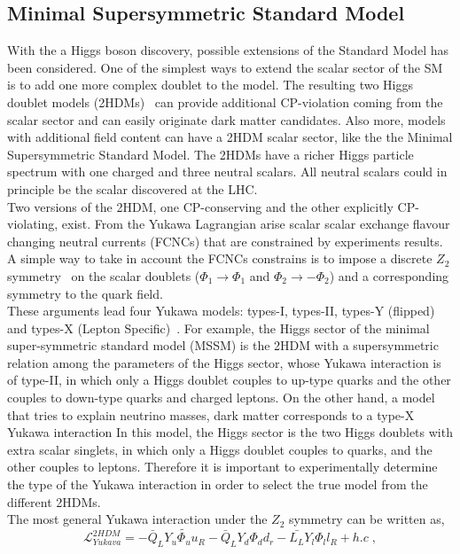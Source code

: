 \subsection*{Minimal Supersymmetric Standard Model} 
With the a Higgs boson discovery, possible extensions of the Standard Model has been considered. 
One of the simplest ways to extend the scalar sector of the SM is to add one more complex doublet to the model.
The resulting two Higgs doublet models (2HDMs)~\cite{Barroso:2013zxa} can provide additional CP-violation coming from the scalar 
sector and can easily originate dark matter candidates.  
Also more,  models with additional field content can have a 2HDM scalar sector, like the  the Minimal Supersymmetric Standard Model.  
The 2HDMs have a richer Higgs particle spectrum with one
charged and three neutral scalars.  All neutral scalars could in principle be the scalar discovered at the LHC.\\
Two versions of the 2HDM,  one CP-conserving and the other explicitly  CP-violating, exist.   
From the Yukawa Lagrangian arise scalar  scalar  exchange  flavour changing neutral currents (FCNCs) that are constrained by experiments results.
A simple way to take in account the FCNCs constrains is to impose a discrete $Z_2$ symmetry~\cite{PhysRevD.15.1958} on the scalar doublets ($\Phi_{1} \to \Phi_{1}$ and  $\Phi_{2} \to -\Phi_{2}$)  and a corresponding symmetry to the quark field.\\
These arguments  lead four Yukawa models: types-I, types-II, types-Y (flipped) and types-X (Lepton Specific)~\cite{PhysRevD.41.3421, PhysRevD.80.015017}. 
For example, the Higgs sector of the minimal super-symmetric standard model (MSSM) is the 2HDM with a supersymmetric relation  among
the parameters of the Higgs sector, whose Yukawa interaction is of type-II, in which only
a Higgs doublet couples to up-type quarks and the other couples to down-type quarks and charged leptons.
On the other hand, a  model that tries to explain neutrino masses, dark matter corresponds to a type-X  Yukawa interaction
In this model,  the Higgs sector is the two Higgs doublets with extra scalar singlets,  in which only a Higgs doublet couples to quarks, and the other couples to leptons. Therefore it is important to experimentally determine the type of the Yukawa interaction in order to select the true model from the different 2HDMs.\\
The most general Yukawa interaction under the $Z_2$ symmetry can be written as,
\newline
\begin{equation}
\mathcal{L}_{Yukava}^{2HDM} = - \bar{Q}_L Y_u \tilde{\Phi_u}u_R  - \bar{Q}_L Y_d \Phi_d d_r  -\bar{L_L} Y_l \Phi_l l_R +h.c  \; , \end{equation}
